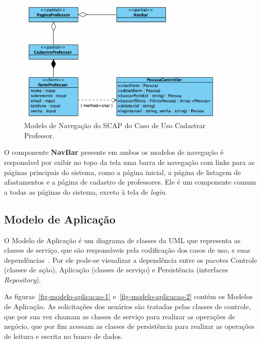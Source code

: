 \begin{figure}
	\centering
	\includegraphics[width=0.9\textwidth]{figuras/fig-modelo-naveg-cadast.png}
	\caption{Modelo de Navegação do SCAP do Caso de Uso Cadastrar Professor.}
	\label{fig-modelo-navegacao-professor}
\end{figure}

O componente \textbf{NavBar} presente em ambos os modelos de navegação é responsável por exibir
no topo da tela uma barra de navegação com links para as páginas principais do sistema, como a página inicial,
a página de listagem de afastamentos e a página de cadastro de professores. Ele é um componente
comum a todas as páginas do sistema, exceto à tela de \textit{login}.

\FloatBarrier



\subsection{Modelo de Aplicação}
\label{subsec-frameweb-aplicacao}
O Modelo de Aplicação é um diagrama de classes da UML que representa as classes de
serviço, que são responsáveis pela codificação dos casos de uso, e suas dependências~\cite{souza:2007}.
Por ele pode-se visualizar a dependência entre os pacotes Controle (classes de ação),
Aplicação (classes de serviço) e Persistência (interfaces \textit{Repository}). 

As figuras~\ref{fig-modelo-aplicacao-1} e~\ref{fig-modelo-aplicacao-2} contém os Modelos de Aplicação.
As solicitações dos usuários são tratadas pelas classes de controle, que por sua vez
chamam as classes de serviço para realizar as operações de negócio, que por fim acessam
as classes de persistência para realizar as operações de leitura e escrita no banco de dados.



